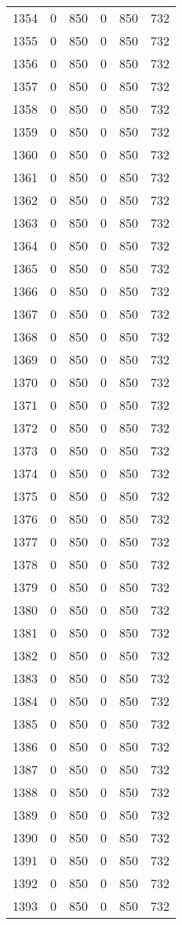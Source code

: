 \documentclass[a4paper]{ctexart}
\begin{document}
\begin{longtable}{p{1cm}|p{2cm}|p{2cm}|p{2cm}|P{2cm}|p{2cm}}
		1354&0&850&0&850&732\\
		1355&0&850&0&850&732\\
		1356&0&850&0&850&732\\
		1357&0&850&0&850&732\\
		1358&0&850&0&850&732\\
		1359&0&850&0&850&732\\
		1360&0&850&0&850&732\\
		1361&0&850&0&850&732\\
		1362&0&850&0&850&732\\
		1363&0&850&0&850&732\\
		1364&0&850&0&850&732\\
		1365&0&850&0&850&732\\
		1366&0&850&0&850&732\\
		1367&0&850&0&850&732\\
		1368&0&850&0&850&732\\
		1369&0&850&0&850&732\\
		1370&0&850&0&850&732\\
		1371&0&850&0&850&732\\
		1372&0&850&0&850&732\\
		1373&0&850&0&850&732\\
		1374&0&850&0&850&732\\
		1375&0&850&0&850&732\\
		1376&0&850&0&850&732\\
		1377&0&850&0&850&732\\
		1378&0&850&0&850&732\\
		1379&0&850&0&850&732\\
		1380&0&850&0&850&732\\
		1381&0&850&0&850&732\\
		1382&0&850&0&850&732\\
		1383&0&850&0&850&732\\
		1384&0&850&0&850&732\\
		1385&0&850&0&850&732\\
		1386&0&850&0&850&732\\
		1387&0&850&0&850&732\\
		1388&0&850&0&850&732\\
		1389&0&850&0&850&732\\
		1390&0&850&0&850&732\\
		1391&0&850&0&850&732\\
		1392&0&850&0&850&732\\
		1393&0&850&0&850&732\\

\end{longtable}
\end{document}
